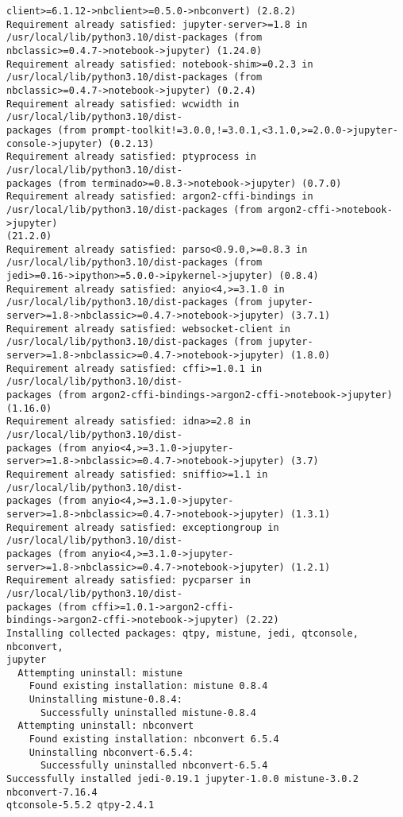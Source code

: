 \documentclass[11pt]{article}
\begin{document}
\begin{Verbatim}[commandchars=\\\{\}]
client>=6.1.12->nbclient>=0.5.0->nbconvert) (2.8.2)
Requirement already satisfied: jupyter-server>=1.8 in
/usr/local/lib/python3.10/dist-packages (from
nbclassic>=0.4.7->notebook->jupyter) (1.24.0)
Requirement already satisfied: notebook-shim>=0.2.3 in
/usr/local/lib/python3.10/dist-packages (from
nbclassic>=0.4.7->notebook->jupyter) (0.2.4)
Requirement already satisfied: wcwidth in /usr/local/lib/python3.10/dist-
packages (from prompt-toolkit!=3.0.0,!=3.0.1,<3.1.0,>=2.0.0->jupyter-
console->jupyter) (0.2.13)
Requirement already satisfied: ptyprocess in /usr/local/lib/python3.10/dist-
packages (from terminado>=0.8.3->notebook->jupyter) (0.7.0)
Requirement already satisfied: argon2-cffi-bindings in
/usr/local/lib/python3.10/dist-packages (from argon2-cffi->notebook->jupyter)
(21.2.0)
Requirement already satisfied: parso<0.9.0,>=0.8.3 in
/usr/local/lib/python3.10/dist-packages (from
jedi>=0.16->ipython>=5.0.0->ipykernel->jupyter) (0.8.4)
Requirement already satisfied: anyio<4,>=3.1.0 in
/usr/local/lib/python3.10/dist-packages (from jupyter-
server>=1.8->nbclassic>=0.4.7->notebook->jupyter) (3.7.1)
Requirement already satisfied: websocket-client in
/usr/local/lib/python3.10/dist-packages (from jupyter-
server>=1.8->nbclassic>=0.4.7->notebook->jupyter) (1.8.0)
Requirement already satisfied: cffi>=1.0.1 in /usr/local/lib/python3.10/dist-
packages (from argon2-cffi-bindings->argon2-cffi->notebook->jupyter) (1.16.0)
Requirement already satisfied: idna>=2.8 in /usr/local/lib/python3.10/dist-
packages (from anyio<4,>=3.1.0->jupyter-
server>=1.8->nbclassic>=0.4.7->notebook->jupyter) (3.7)
Requirement already satisfied: sniffio>=1.1 in /usr/local/lib/python3.10/dist-
packages (from anyio<4,>=3.1.0->jupyter-
server>=1.8->nbclassic>=0.4.7->notebook->jupyter) (1.3.1)
Requirement already satisfied: exceptiongroup in /usr/local/lib/python3.10/dist-
packages (from anyio<4,>=3.1.0->jupyter-
server>=1.8->nbclassic>=0.4.7->notebook->jupyter) (1.2.1)
Requirement already satisfied: pycparser in /usr/local/lib/python3.10/dist-
packages (from cffi>=1.0.1->argon2-cffi-
bindings->argon2-cffi->notebook->jupyter) (2.22)
Installing collected packages: qtpy, mistune, jedi, qtconsole, nbconvert,
jupyter
  Attempting uninstall: mistune
    Found existing installation: mistune 0.8.4
    Uninstalling mistune-0.8.4:
      Successfully uninstalled mistune-0.8.4
  Attempting uninstall: nbconvert
    Found existing installation: nbconvert 6.5.4
    Uninstalling nbconvert-6.5.4:
      Successfully uninstalled nbconvert-6.5.4
Successfully installed jedi-0.19.1 jupyter-1.0.0 mistune-3.0.2 nbconvert-7.16.4
qtconsole-5.5.2 qtpy-2.4.1
    \end{Verbatim}
\end{document}
